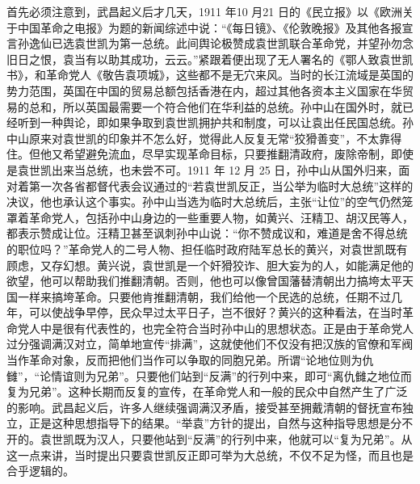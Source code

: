 首先必须注意到，武昌起义后才几天，1911 年10 月21 日的《民立报》以《欧洲关于中国革命之电报》为题的新闻综述中说：“《每日镜》、《伦敦晚报》及其他各报宣言孙逸仙已选袁世凯为第一总统。此间舆论极赞成袁世凯联合革命党，并望孙勿念旧日之恨，袁当有以助其成功，云云。”紧跟着便出现了无人署名的《鄂人致袁世凯书》，和革命党人《敬告袁项城》，这些都不是无穴来风。当时的长江流域是英国的势力范围，英国在中国的贸易总额包括香港在内，超过其他各资本主义国家在华贸易的总和，所以英国最需要一个符合他们在华利益的总统。孙中山在国外时，就已经听到一种舆论，即如果争取到袁世凯拥护共和制度，可以让袁出任民国总统。孙中山原来对袁世凯的印象并不怎么好，觉得此人反复无常“狡猾善变”，不太靠得住。但他又希望避免流血，尽早实现革命目标，只要推翻清政府，废除帝制，即使是袁世凯出来当总统，也未尝不可。1911 年 12 月 25 日，孙中山从国外归来，面对着第一次各省都督代表会议通过的“若袁世凯反正，当公举为临时大总统”这样的决议，他也承认这个事实。孙中山当选为临时大总统后，主张“让位”的空气仍然笼罩着革命党人，包括孙中山身边的一些重要人物，如黄兴、汪精卫、胡汉民等人，都表示赞成让位。汪精卫甚至讽刺孙中山说：“你不赞成议和，难道是舍不得总统的职位吗？”革命党人的二号人物、担任临时政府陆军总长的黄兴，对袁世凯既有顾虑，又存幻想。黄兴说，袁世凯是一个奸猾狡诈、胆大妄为的人，如能满足他的欲望，他可以帮助我们推翻清朝。否则，他也可以像曾国藩替清朝出力搞垮太平天国一样来搞垮革命。只要他肯推翻清朝，我们给他一个民选的总统，任期不过几年，可以使战争早停，民众早过太平日子，岂不很好？黄兴的这种看法，在当时革命党人中是很有代表性的，也完全符合当时孙中山的思想状态。正是由于革命党人过分强调满汉对立，简单地宣传“排满”，这就使他们不仅没有把汉族的官僚和军阀当作革命对象，反而把他们当作可以争取的同胞兄弟。所谓“论地位则为仇雠”，“论情谊则为兄弟”。只要他们站到“反满”的行列中来，即可“离仇雠之地位而复为兄弟”。这种长期而反复的宣传，在革命党人和一般的民众中自然产生了广泛的影响。武昌起义后，许多人继续强调满汉矛盾，接受甚至拥戴清朝的督抚宣布独立，正是这种思想指导下的结果。“举袁”方针的提出，自然与这种指导思想是分不开的。袁世凯既为汉人，只要他站到“反满”的行列中来，他就可以“复为兄弟”。从这一点来讲，当时提出只要袁世凯反正即可举为大总统，不仅不足为怪，而且也是合乎逻辑的。

